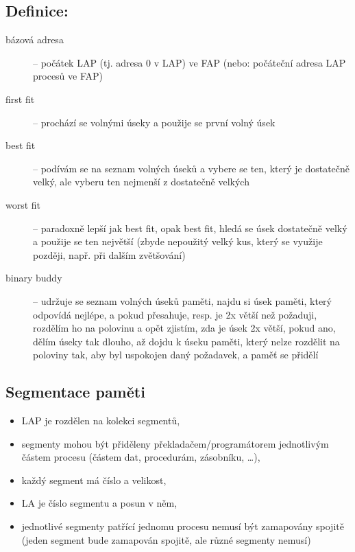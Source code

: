 \documentclass[a4paper, 11pt]{article}
\begin{document}
\subsection*{Definice:}
\begin{description}
\item[bázová adresa] -- počátek LAP (tj. adresa 0 v LAP) ve FAP (nebo: počáteční adresa LAP procesů ve FAP)

\item[first fit] -- prochází se volnými úseky a použije se první volný úsek

\item[best fit] -- podívám se na seznam volných úseků a vybere se ten, který je dostatečně velký, ale vyberu ten nejmenší z dostatečně velkých

\item[worst fit] -- paradoxně lepší jak best fit, opak best fit, hledá se úsek dostatečně velký a použije se ten největší (zbyde nepoužitý velký kus, který se využije později, např. při dalším zvětšování)

\item[binary buddy] -- udržuje se seznam volných úseků paměti, najdu si úsek paměti, který odpovídá nejlépe, a pokud přesahuje, resp. je 2x větší než požaduji, rozdělím ho na polovinu a opět zjistím, zda je úsek 2x větší, pokud ano, dělím úseky tak dlouho, až dojdu k úseku paměti, který nelze rozdělit na poloviny tak, aby byl uspokojen daný požadavek, a paměť se přidělí
\end{description}

\subsection{Segmentace paměti}
\begin{itemize}
    \item LAP je rozdělen na kolekci segmentů,
    \item segmenty mohou být přiděleny překladačem/programátorem jednotlivým částem procesu (částem dat, procedurám, zásobníku, \ldots),
    \item každý segment má číslo a velikost,
    \item LA je číslo segmentu a posun v něm,
    \item jednotlivé segmenty patřící jednomu procesu nemusí být zamapovány spojitě (jeden segment bude zamapován spojitě, ale různé segmenty nemusí)
\end{itemize}
 
\end{document}

